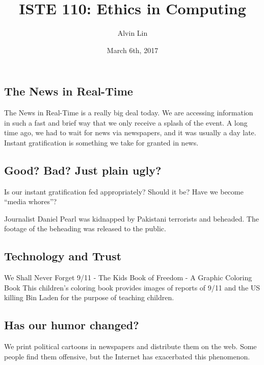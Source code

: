 \documentclass{article}
\title{ISTE 110: Ethics in Computing}
\author{Alvin Lin}
\date{March 6th, 2017}
\begin{document}
\maketitle

\subsection*{The News in Real-Time}
The News in Real-Time is a really big deal today. We are accessing information
in such a fast and brief way that we only receive a splash of the event.
A long time ago, we had to wait for news via newspapers, and it was usually
a day late. Instant gratification is something we take for granted in news.

\subsection*{Good? Bad? Just plain ugly?}
Is our instant gratification fed appropriately? Should it be? Have we become
``media whores''? \par
Journalist Daniel Pearl was kidnapped by Pakistani terrorists and beheaded. The
footage of the beheading was released to the public.

\subsection*{Technology and Trust}
We Shall Never Forget 9/11 - The Kids Book of Freedom - A Graphic Coloring Book
This children's coloring book provides images of reports of 9/11 and the US
killing Bin Laden for the purpose of teaching children.

\subsection*{Has our humor changed?}
We print political cartoons in newspapers and distribute them on the web. Some
people find them offensive, but the Internet has exacerbated this phenomenon.
\end{document}
